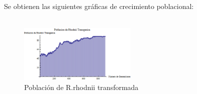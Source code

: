 \documentclass[12pt]{article}
\numberwithin{equation}{section}
\begin{document}
Se obtienen las siguientes gráficas de crecimiento poblacional:\\\\

\begin{figure}[!ht]
\begin{floatrow}
\end{floatrow}
\FloatBarrier
\end{figure}
\FloatBarrier


\begin{figure}[!ht]
\includegraphics[width=0.5\textwidth]{poblacion_rhodnii_trans.png}
\caption{Población de R.rhodnii transformada}
\FloatBarrier
\end{figure}
\FloatBarrier
\end{document}
